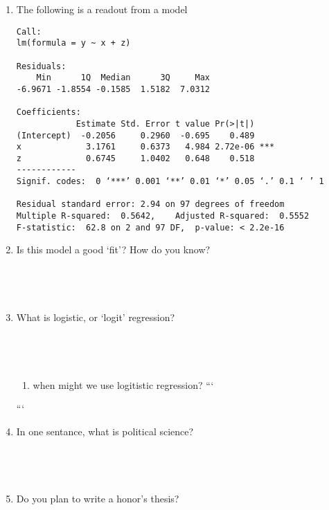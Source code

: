 \documentclass{article}
\begin{document}
\begin{enumerate}
\begin{verbatim}




\end{verbatim}
\item
  The following is a readout from a model

\begin{verbatim}
Call:
lm(formula = y ~ x + z)

Residuals:
    Min      1Q  Median      3Q     Max 
-6.9671 -1.8554 -0.1585  1.5182  7.0312 

Coefficients:
            Estimate Std. Error t value Pr(>|t|)    
(Intercept)  -0.2056     0.2960  -0.695    0.489    
x             3.1761     0.6373   4.984 2.72e-06 ***
z             0.6745     1.0402   0.648    0.518    
------------
Signif. codes:  0 ‘***’ 0.001 ‘**’ 0.01 ‘*’ 0.05 ‘.’ 0.1 ‘ ’ 1

Residual standard error: 2.94 on 97 degrees of freedom
Multiple R-squared:  0.5642,    Adjusted R-squared:  0.5552 
F-statistic:  62.8 on 2 and 97 DF,  p-value: < 2.2e-16
\end{verbatim}
\item
  Is this model a good `fit'? How do you know?

\begin{verbatim}




\end{verbatim}
\item
  What is logistic, or `logit' regression?

\begin{verbatim}




\end{verbatim}

  \begin{enumerate}
  \def\labelenumii{\alph{enumii}.}
  \itemsep1pt\parskip0pt
  \item
    when might we use logitistic regression? ```
  \end{enumerate}

  ```
\item
  In one sentance, what is political science?

\begin{verbatim}




\end{verbatim}
\item
  Do you plan to write a honor's thesis?

\begin{verbatim}




\end{verbatim}
\end{enumerate}
\end{document}
